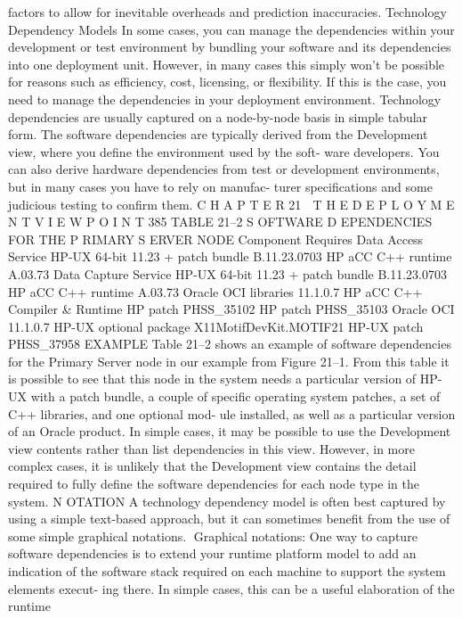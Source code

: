 factors to allow for inevitable overheads and prediction inaccuracies.
Technology Dependency Models
In some cases, you can manage the dependencies within your development or
test environment by bundling your software and its dependencies into one
deployment unit. However, in many cases this simply won’t be possible for
reasons such as efficiency, cost, licensing, or flexibility. If this is the case, you
need to manage the dependencies in your deployment environment.
Technology dependencies are usually captured on a node-by-node basis
in simple tabular form. The software dependencies are typically derived from
the Development view, where you define the environment used by the soft-
ware developers. You can also derive hardware dependencies from test or
development environments, but in many cases you have to rely on manufac-
turer specifications and some judicious testing to confirm them.
C H A P T E R 21  T H E D E P L O Y M E N T V I E W P O I N T
 385
TABLE 21–2 S OFTWARE D EPENDENCIES FOR THE P RIMARY S ERVER NODE
Component
 Requires
Data Access Service
 HP-UX 64-bit 11.23 + patch bundle B.11.23.0703
HP aCC C++ runtime A.03.73
Data Capture Service
 HP-UX 64-bit 11.23 + patch bundle B.11.23.0703
HP aCC C++ runtime A.03.73
Oracle OCI libraries 11.1.0.7
HP aCC C++ Compiler & Runtime
 HP patch PHSS_35102
HP patch PHSS_35103
Oracle OCI 11.1.0.7
 HP-UX optional package X11MotifDevKit.MOTIF21
HP-UX patch PHSS_37958
EXAMPLE Table 21–2 shows an example of software dependencies for
the Primary Server node in our example from Figure 21–1.
From this table it is possible to see that this node in the system needs
a particular version of HP-UX with a patch bundle, a couple of specific
operating system patches, a set of C++ libraries, and one optional mod-
ule installed, as well as a particular version of an Oracle product.
In simple cases, it may be possible to use the Development view contents
rather than list dependencies in this view. However, in more complex cases, it
is unlikely that the Development view contains the detail required to fully
define the software dependencies for each node type in the system.
N OTATION A technology dependency model is often best captured by using
a simple text-based approach, but it can sometimes benefit from the use of
some simple graphical notations.
Graphical notations: One way to capture software dependencies is to
extend your runtime platform model to add an indication of the software
stack required on each machine to support the system elements execut-
ing there. In simple cases, this can be a useful elaboration of the runtime

